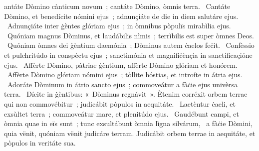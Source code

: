 { }
{%
antáte Dòmino cànticum novum~; cantáte Dòmino, òmnis terra. 
~Cantáte Dòmino, et benedícite nómini ejus~; adnunçiáte de die in diem salutáre ejus. 
~Adnunçiáte inter ġèntes glóriam ejus~; in òmnibus pòpulïs mirabìlia ejus. 
~Quóniam magnus Dòminus, et laudábilis nìmis~; terrìbilis est super òmnes Deos. 
~Quóniam òmnes dei ġèntium daemónia~; Dòminus autem ċaelos feċit. 
~Confèssio et pulchritúdo in conspèctu ejus~; sanctimónia et magnifiċènçia in sanctificaçióne ejus. 
~Affèrte Dòmino, pàtriae ġèntium, affèrte Dòmino glóriam et honórem. 
~Affèrte Dòmino glóriam nómini ejus~; tòllite hóstias, et introíte in átria ejus. 
~Adoráte Dòminum in átrio sancto ejus~; commoveátur a fàċie ejus univèrsa terra. 
~Dícite in ġèntibus: «~Dòminus regnávit~». Ètenim corréxit orbem terrae qui non commovébitur~; judicábit pòpulos in aequitáte. 
~Laetèntur ċaeli, et exsùltet terra~; commoveátur mare, et plenitúdo ejus. 
~Gaudébunt campi, et òmnia quae in eïs sunt~; tunc exsultábunt òmnia lìgna silvárum, 
~a fàċie Dòmini, quia vënit, quóniam vënit judicáre terram. Judicábit orbem terrae in aequitáte, et pòpulos in veritáte sua. 
}
